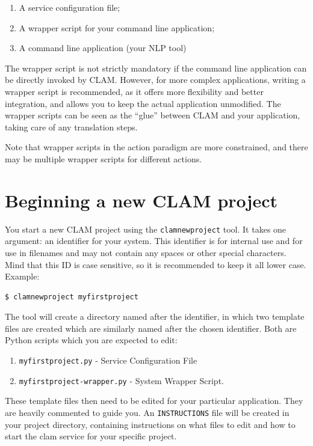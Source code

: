 \documentclass[a4paper,12pt,twoside,openright]{report}
\begin{document}
\begin{enumerate}
\item A service configuration file;
\item A wrapper script for your command line application;
\item A command line application (your NLP tool)
\end{enumerate}

The wrapper script is not strictly mandatory if the command line application can be
directly invoked by CLAM. However, for more complex applications, writing a
wrapper script is recommended, as it offers more flexibility and
better integration, and allows you to keep the actual application
unmodified. The wrapper scripts can be seen as the ``glue'' between CLAM and
your application, taking care of any translation steps.

Note that wrapper scripts in the action paradigm are more constrained,  and
there may be multiple wrapper scripts for different actions.

\section{Beginning a new CLAM project}

You start a new CLAM project using the \texttt{clamnewproject} tool. It takes
one argument: an identifier for your system. This identifier is for internal
use and for use in filenames and may not contain any spaces or other special
characters. Mind that this ID is case sensitive, so it is recommended to keep
it all lower case. Example:

{ \small
\begin{verbatim}
$ clamnewproject myfirstproject 
\end{verbatim}
}

The tool will create a directory named after the identifier, in which two
template files are created which are similarly named after the chosen
identifier. Both are Python scripts which you are expected to edit:

\begin{enumerate}
\item \texttt{myfirstproject.py} - Service Configuration File
\item \texttt{myfirstproject-wrapper.py} - System Wrapper Script.
\end{enumerate}

These template files then need to be edited for your particular application.
They are heavily commented to guide you. An \texttt{INSTRUCTIONS} file will be
created in your project directory, containing instructions on what files to
edit and  how to start the clam service for your specific project.
\end{document}
